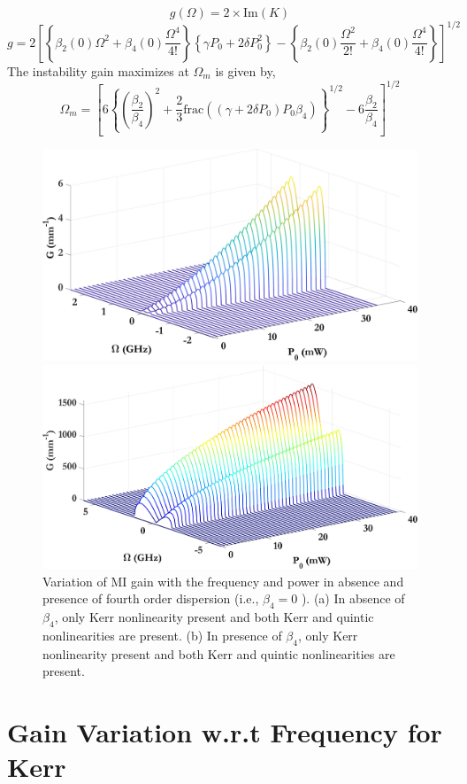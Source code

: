 \documentclass[a4paper,12pt]{article}
\begin{document}
\begin{equation}
g(\Omega) = 2 \times \text{Im}(K)
\tag{48}
\end{equation}
\begin{equation}
g = 2 \left[ \left\{ \beta_2(0) \Omega^2 + \beta_4(0) \frac{\Omega^4}{4!} \right\} \left\{ \gamma P_0 + 2 \delta P_0^2 \right\} - \left\{ \beta_2(0) \frac{\Omega^2}{2!} + \beta_4(0) \frac{\Omega^4}{4!} \right\} \right]^{1/2}
\tag{49}
\end{equation}
The instability gain maximizes at $\Omega_m$ is given by,
\begin{equation}
\Omega_m = \left[ 6 \left\{ \left( \frac{\beta_2}{\beta_4} \right)^2 + \frac{2}{3} \text{frac} \left( (\gamma + 2\delta P_0) P_0 \beta_4 \right) \right\}^{1/2} - 6 \frac{\beta_2}{\beta_4} \right]^{1/2}
\tag{50}
\end{equation}

\begin{figure}[h]
  \centering
  \begin{minipage}{0.48\textwidth}
    \centering
    \includegraphics[width=\linewidth]{Plots/Beta2_Kerr.jpeg}
    \subcaption{}
  \end{minipage}%
  \hfill
  \begin{minipage}{0.48\textwidth}
    \centering
    \includegraphics[width=\linewidth]{Plots/Beta4_Kerr.jpeg}
    \subcaption{}
  \end{minipage}
  \caption{Variation of MI gain with the frequency and power in absence and presence of fourth order dispersion (i.e., \(\beta_4=0\) ). (a) In absence of \(\beta_4\), only Kerr nonlinearity present and both Kerr and quintic nonlinearities are present. (b) In presence of \(\beta_4\), only Kerr nonlinearity present and both Kerr and quintic nonlinearities are present.}
  \label{fig:gain}
\end{figure}

\section{Gain Variation w.r.t Frequency for Kerr}
\end{document}
